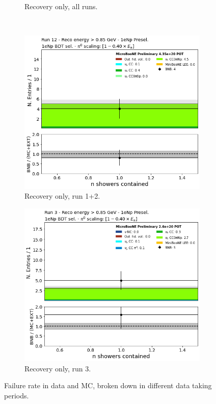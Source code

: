 \begin{figure}[H]
\begin{subfigure}{0.35\textwidth}
    \caption{Recovery only, all runs.}
    \end{subfigure} \\
    \begin{subfigure}{0.35\textwidth}
    \includegraphics[width=1.00\textwidth]{Sidebands/Figures/CutUpdates/recovery-runs12.png}
    \caption{Recovery only, run 1+2.}
    \end{subfigure}
    \begin{subfigure}{0.35\textwidth}
    \includegraphics[width=1.00\textwidth]{Sidebands/Figures/CutUpdates/recovery-runs3.png}
    \caption{Recovery only, run 3.}
    \end{subfigure}
    \caption{Failure rate in data and MC, broken down in different data taking periods.}
    \label{failurerate}
\end{figure}

